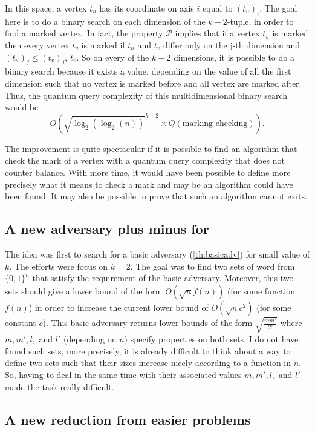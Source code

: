 In this space, a vertex $t_u$ has its coordinate on axis $i$ equal to $(t_u)_i$.
The goal here is to do a binary search on each
dimension of the $k-2$-tuple, in order to find a marked vertex.
In fact, the property $\mathcal{P}$ implies that if a vertex $t_u$
is marked then every vertex $t_v$ is marked if $t_u$ and $t_v$ differ
only on the j-th dimension and $(t_u)_j\leq (t_v)_j$, $t_v$. So on every
of the $k-2$ dimensions, it is possible to do a binary search because
it exists a value, depending on the value of all the first dimension such that
no vertex is marked before and all vertex are marked after. Thus, the quantum
query complexity of this multidimensional binary search would be
\[O\left(\sqrt{\log_2(\log_2(n))}^{k-2} \times Q(\textrm{marking\ checking})\right).\]

The improvement is quite spectacular if it is possible to find an algorithm
that check the mark of a vertex with a quantum query complexity that does not
counter balance. With more time, it would have been possible to define more
precisely what it means to check a mark and may be an algorithm could have been
found. It may also be possible to prove that such an algorithm cannot exits.

\subsection{A new adversary plus minus for }

The idea was first to search for a basic adversary (\autoref{th:basicadv}) for small value of $k$.
The efforts were focus on $k=2$. The goal was to find two sets of word from
$\{0,1\}^n$ that satisfy the requirement of the basic adversary. Moreover,
this two sets should give a lower bound of the form
$O(\sqrt{n}f(n))$ (for some function $f(n)$) in order to increase the current
lower bound of $O(\sqrt{n}c^2)$ (for some constant $c$).
This basic adversary returns lower bounds of the form
$\sqrt{\frac{mm'}{ll'}}$ where $m,m',l,$ and $l'$ (depending on $n$)
specify properties on both sets. I do not have found such sets,
more precisely, it is already difficult to think about a way
to define two sets such that their sizes increase nicely according
to a function in $n$. So, having to deal in the same time with
their associated values $m,m',l,$ and $l'$ made the task really difficult.


\subsection{A new reduction from easier problems}

